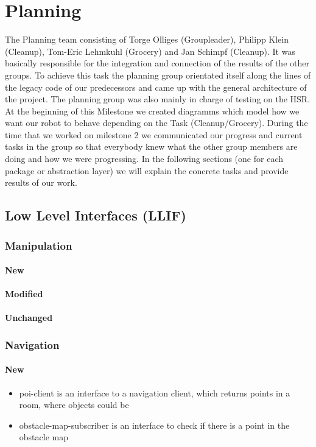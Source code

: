 \documentclass[main.tex]{subfiles}
\begin{document}
	
	\chapter{Planning}
                The Planning team consisting of Torge Olliges (Groupleader), Philipp Klein (Cleanup), Tom-Eric Lehmkuhl (Grocery) and Jan Schimpf (Cleanup). It was basically responsible for the integration and connection of the results of the other groups. To achieve this task the planning group orientated itself along the lines of the legacy code of our predecessors and came up with the general architecture of the project. The planning group was also mainly in charge of testing on the HSR. At the beginning of this Milestone we created diagramms which model how we want our robot to behave depending on the Task (Cleanup/Grocery). During the time that we worked on milestone 2 we communicated our progress and current tasks in the group so that everybody knew what the other group members are doing and how we were progressing. In the following sections (one for each package or abstraction layer) we will explain the concrete tasks and provide results of our work.
                \section{Low Level Interfaces (LLIF)}
                \subsection{Manipulation}
                \subsubsection{New}
                \subsubsection{Modified}
                \subsubsection{Unchanged}
                \subsection{Navigation}
                \subsubsection{New}
                \begin{itemize}
 				 \item poi-client is an interface to a navigation client, which returns points in a room, where objects could be 
  				 \item obstacle-map-subscriber is an interface to check if there is a point in the obstacle map
				\end{itemize}  
\end{document}
